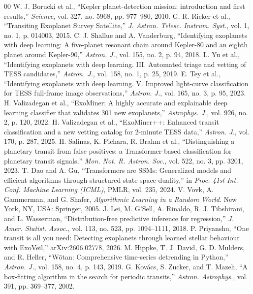 \documentclass[conference,a4paper]{IEEEtran}
\begin{document}
\begin{thebibliography}{00}
 W. J. Borucki et al., ``Kepler planet-detection mission: introduction and first results,'' \textit{Science}, vol. 327, no. 5968, pp. 977--980, 2010.
 G. R. Ricker et al., ``Transiting Exoplanet Survey Satellite,'' \textit{J. Astron. Telesc. Instrum. Syst.}, vol. 1, no. 1, p. 014003, 2015.
 C. J. Shallue and A. Vanderburg, ``Identifying exoplanets with deep learning: A five-planet resonant chain around Kepler-80 and an eighth planet around Kepler-90,'' \textit{Astron. J.}, vol. 155, no. 2, p. 94, 2018.
 L. Yu et al., ``Identifying exoplanets with deep learning. III. Automated triage and vetting of TESS candidates,'' \textit{Astron. J.}, vol. 158, no. 1, p. 25, 2019.
 E. Tey et al., ``Identifying exoplanets with deep learning. V. Improved light-curve classification for TESS full-frame image observations,'' \textit{Astron. J.}, vol. 165, no. 3, p. 95, 2023.
 H. Valizadegan et al., ``ExoMiner: A highly accurate and explainable deep learning classifier that validates 301 new exoplanets,'' \textit{Astrophys. J.}, vol. 926, no. 2, p. 120, 2022.
 H. Valizadegan et al., ``ExoMiner++: Enhanced transit classification and a new vetting catalog for 2-minute TESS data,'' \textit{Astron. J.}, vol. 170, p. 287, 2025.
 H. Salinas, K. Pichara, R. Brahm et al., ``Distinguishing a planetary transit from false positives: a Transformer-based classification for planetary transit signals,'' \textit{Mon. Not. R. Astron. Soc.}, vol. 522, no. 3, pp. 3201, 2023.
 T. Dao and A. Gu, ``Transformers are SSMs: Generalized models and efficient algorithms through structured state space duality,'' in \textit{Proc. 41st Int. Conf. Machine Learning (ICML)}, PMLR, vol. 235, 2024.
 V. Vovk, A. Gammerman, and G. Shafer, \textit{Algorithmic Learning in a Random World}. New York, NY, USA: Springer, 2005.
 J. Lei, M. G'Sell, A. Rinaldo, R. J. Tibshirani, and L. Wasserman, ``Distribution-free predictive inference for regression,'' \textit{J. Amer. Statist. Assoc.}, vol. 113, no. 523, pp. 1094--1111, 2018.
 P. Priyanshu, ``One transit is all you need: Detecting exoplanets through learned stellar behaviour with ExoVeil,'' arXiv:2606.02778, 2026.
 M. Hippke, T. J. David, G. D. Mulders, and R. Heller, ``W\={o}tan: Comprehensive time-series detrending in Python,'' \textit{Astron. J.}, vol. 158, no. 4, p. 143, 2019.
 G. Kov\'acs, S. Zucker, and T. Mazeh, ``A box-fitting algorithm in the search for periodic transits,'' \textit{Astron. Astrophys.}, vol. 391, pp. 369--377, 2002.

\end{thebibliography}
\end{document}
